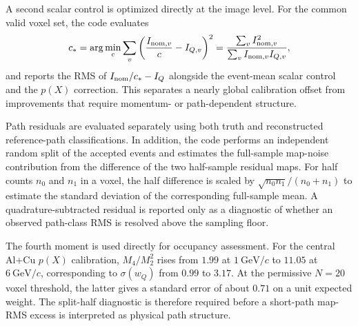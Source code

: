 \documentclass[aps,pra,reprint,longbibliography,floatfix]{revtex4-2}
\begin{document}
A second scalar control is optimized directly at the image level.  For the common valid voxel set, the code evaluates
\begin{equation}
 c_* = \arg\min_c \sum_v\left(\frac{I_{{\rm nom},v}}{c}-I_{Q,v}\right)^2
 =\frac{\sum_v I_{{\rm nom},v}^2}{\sum_v I_{{\rm nom},v}I_{Q,v}},
\end{equation}
and reports the RMS of $I_{\rm nom}/c_*-I_Q$ alongside the event-mean scalar control and the $p(X)$ correction.  This separates a nearly global calibration offset from improvements that require momentum- or path-dependent structure.

Path residuals are evaluated separately using both truth and reconstructed reference-path classifications.  In addition, the code performs an independent random split of the accepted events and estimates the full-sample map-noise contribution from the difference of the two half-sample residual maps.  For half counts $n_0$ and $n_1$ in a voxel, the half difference is scaled by $\sqrt{n_0n_1}/(n_0+n_1)$ to estimate the standard deviation of the corresponding full-sample mean.  A quadrature-subtracted residual is reported only as a diagnostic of whether an observed path-class RMS is resolved above the sampling floor.

The fourth moment is used directly for occupancy assessment.  For the central Al+Cu $p(X)$ calibration, $M_4/M_2^2$ rises from $1.99$ at $1~\mathrm{GeV}/c$ to $11.05$ at $6~\mathrm{GeV}/c$, corresponding to $\sigma(w_Q)$ from $0.99$ to $3.17$.  At the permissive $N=20$ voxel threshold, the latter gives a standard error of about $0.71$ on a unit expected weight.  The split-half diagnostic is therefore required before a short-path map-RMS excess is interpreted as physical path structure.
\end{document}
